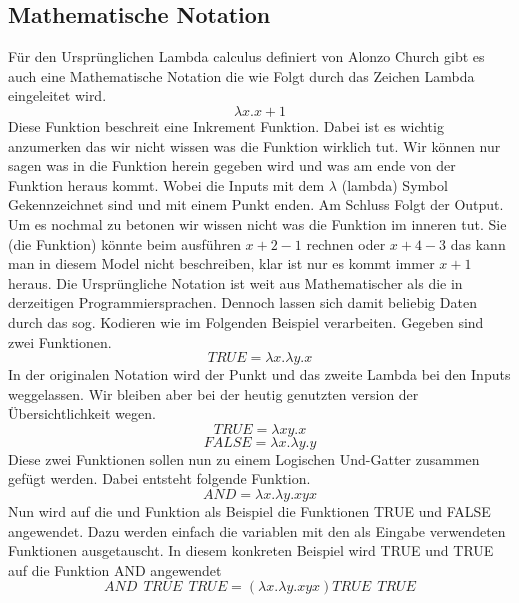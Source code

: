 \subsection{Mathematische Notation}
Für den Ursprünglichen Lambda calculus definiert von Alonzo Church gibt es auch 
eine Mathematische Notation die wie Folgt durch das Zeichen Lambda eingeleitet wird.
\begin{equation}
\lambda x. x + 1
\end{equation}
Diese Funktion beschreit eine Inkrement Funktion. Dabei ist es wichtig anzumerken das wir nicht wissen was die Funktion wirklich tut. Wir können nur sagen was in die Funktion herein gegeben wird und was am ende von der Funktion heraus kommt. Wobei die Inputs mit dem $\lambda$ (lambda) Symbol Gekennzeichnet sind und mit einem Punkt enden. Am Schluss Folgt der Output. Um es nochmal zu betonen wir wissen nicht was die Funktion im inneren tut. Sie (die Funktion) könnte beim ausführen $x + 2 - 1$ rechnen oder $x + 4 - 3$ das kann man in diesem Model nicht beschreiben, klar ist nur es kommt immer $x + 1$ heraus.
Die Ursprüngliche Notation ist weit aus Mathematischer als die in derzeitigen Programmiersprachen. Dennoch lassen sich damit beliebig Daten durch das sog. Kodieren wie im Folgenden Beispiel verarbeiten.
Gegeben sind zwei Funktionen.
\begin{equation}
TRUE = \lambda x. \lambda y. x
\end{equation}
In der originalen Notation wird der Punkt und das zweite Lambda bei den Inputs weggelassen. Wir bleiben aber bei der heutig genutzten version der Übersichtlichkeit wegen. \cite{churchcalculi}
\begin{equation}
TRUE = \lambda xy. x
\end{equation}
\begin{equation}
FALSE = \lambda x. \lambda y. y
\end{equation}
Diese zwei Funktionen sollen nun zu einem Logischen Und-Gatter zusammen gefügt werden.
Dabei entsteht folgende Funktion.
\begin{equation}
AND = \lambda x. \lambda y. x y x
\end{equation}
Nun wird auf die und Funktion als Beispiel die Funktionen TRUE und FALSE angewendet. Dazu werden einfach die variablen mit den als Eingabe verwendeten Funktionen ausgetauscht. In diesem konkreten Beispiel wird TRUE und TRUE auf die Funktion AND angewendet
\begin{equation}
AND\:\:TRUE\:\:TRUE = (\lambda x. \lambda y. x y x) TRUE\:\:TRUE 
\end{equation}
